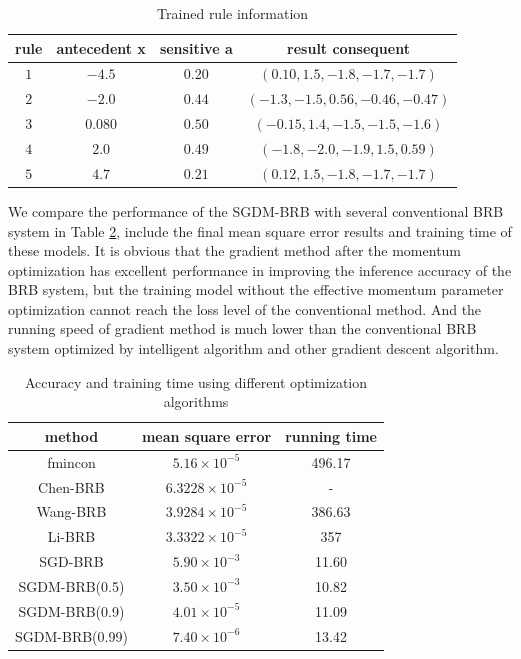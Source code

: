 \documentclass{ieeeaccess}
\begin{document}
\begin{table}
    \caption{Trained rule information}
    \centering
    \label{tab2}
    \begin{tabular}{cccc}
        \hline
        rule & antecedent x & sensitive a & result consequent                       \\
        \hline
        $1$  & $-4.5$       & $0.20$      & $(0.10, 1.5, -1.8, -1.7, -1.7)$         \\
        $2$  & $-2.0$       & $0.44$      & $(-1.3 , -1.5 ,  0.56  , -0.46, -0.47)$ \\
        $3$  & $0.080$      & $0.50$      & $(-0.15,  1.4 , -1.5 , -1.5 , -1.6   )$ \\
        $4$  & $2.0$        & $0.49$      & $(-1.8 , -2.0 , -1.9 ,  1.5 ,  0.59)$   \\
        $5$  & $4.7$        & $0.21$      & $(0.12,  1.5 , -1.8 , -1.7, -1.7)$      \\
        \hline
    \end{tabular}
\end{table}

We compare the performance of the SGDM-BRB with several conventional BRB system in Table \ref{tab3},
include the final mean square error results and training time of these models.
It is obvious that the gradient method after the momentum optimization has excellent performance in improving the inference accuracy of the BRB system,
but the training model without the effective momentum parameter optimization cannot reach the loss level of the conventional method.
And the running speed of gradient method is much lower than the conventional BRB system optimized by intelligent algorithm and other gradient descent algorithm.

\begin{table}
    \caption{Accuracy and training time using different optimization algorithms}
    \centering
    \label{tab3}
    \begin{tabular}{ccc}
        \hline
        method         & mean square error     & running time \\
        \hline
        fmincon        & $5.16\times10^{-5}$   & 496.17       \\
        Chen-BRB       & $6.3228\times10^{-5}$ & -            \\
        Wang-BRB       & $3.9284\times10^{-5}$ & 386.63       \\
        Li-BRB         & $3.3322\times10^{-5}$ & 357          \\
        SGD-BRB        & $5.90\times10^{-3}$   & 11.60        \\
        SGDM-BRB(0.5)  & $3.50\times10^{-3}$   & 10.82        \\
        SGDM-BRB(0.9)  & $4.01\times10^{-5}$   & 11.09        \\
        SGDM-BRB(0.99) & $7.40\times10^{-6}$   & 13.42        \\
        \hline
    \end{tabular}
\end{table}
\end{document}
